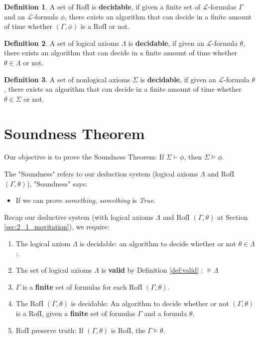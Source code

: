 \documentclass[11pt,letterpaper]{book}
\theoremstyle{definition}
\newtheorem{definition}{Definition}[section]
\begin{document}
\begin{definition}
\label{def:RofI_decidable}
A set of RofI is \textbf{decidable}, if given a finite set of
$\mathcal{L}$-formulas $\Gamma$ and an $\mathcal{L}$-formula $\phi$,
there exists an algorithm that can decide in a finite amount of time
whether $(\Gamma, \phi)$ is a RofI or not.
\end{definition}


\begin{definition}
\label{def:logical_axioms_decidable}
A set of logical axioms $\Lambda$ is \textbf{decidable}, if given an
$\mathcal{L}$-formula $\theta$, there exists an algorithm that can
decide in a finite amount of time whether $\theta \in \Lambda$ or not.
\end{definition}

\begin{definition}
\label{def:nonlogical_axioms_decidable}
A set of nonlogical axioms $\Sigma$ is \textbf{decidable}, if given an
$\mathcal{L}$-formula $\theta$, there exists an algorithm that can
decide in a finite amount of time whether $\theta \in \Sigma$ or not.
\end{definition}


\section{Soundness Theorem}

Our objective is to prove the Soundness Theorem: If $\Sigma \vdash
\phi$, then $\Sigma \models \phi$.

The "Soundness" refers to our deduction system (logical axioms $\Lambda$
and RofI $(\Gamma, \theta)$), "Soundness" says:
\begin{itemize}
\item{If we can prove \emph{something}, \emph{something} is \emph{True}.}
\end{itemize}



Recap our deductive system (with logical axioms $\Lambda$ and RofI
$(\Gamma, \theta)$ at Section \ref{sec:2_1_movitation}), we require:
\begin{enumerate}
\item{The logical axiom $\Lambda$ is decidable: an algorithm to decide
whether or not $\theta \in
\Lambda$:.}\label{de_sys_require_1}
\item{The set of logical axioms $\Lambda$ is \textbf{valid} by Definition
\ref{def:valid} : $\models \Lambda $}\label{de_sys_require_4}
\item{$\Gamma$ is a \textbf{finite} set of formulas for each RofI
$(\Gamma , \theta)$.}\label{de_sys_require_3}
\item{The RofI $(\Gamma, \theta)$ is decidable: An algorithm to decide
whether or not $(\Gamma, \theta)$ is a RofI, given a \textbf{finite} set
of formulas $\Gamma$ and a
formula $\theta$.}\label{de_sys_require_2}
\item{RofI preserve truth: If $(\Gamma, \theta)$ is RofI, the $\Gamma
\models \theta$.}\label{de_sys_require_5}
\end{enumerate}
\end{document}
